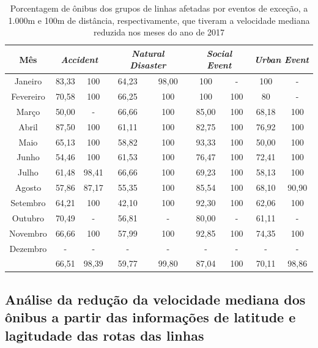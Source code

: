 \documentclass[
	12pt,				%
	oneside,			%
	a4paper,			%
	english,			%
	brazil				%
	]{abntex2ppgsi}
\begin{document}
{{\begin{table}[!htb]
\centering
\caption {Porcentagem de ônibus dos grupos de linhas afetadas por eventos de exceção, a 1.000m e 100m de distância, respectivamente, que tiveram a velocidade mediana reduzida nos meses do ano de 2017}
\label{tab:exceptEventVelocityImpAllStop}
\begin{tabular}{c|cc|cc|cc|cc}
\toprule
\textbf{Mês} & \multicolumn{2}{c}{\textit{\textbf{Accident}}} & \multicolumn{2}{c}{\textit{\textbf{Natural Disaster}}} & \multicolumn{2}{c}{\textit{\textbf{Social Event}}} &
\multicolumn{2}{c}{\textit{\textbf{Urban Event}}}\\
\midrule
Janeiro & 83,33 &  100 & 
64,23 &  98,00 & 
100 & - &
 100 & - \\
\hline
Fevereiro & 70,58 &  100 &
 66,25 &  100 &
 100 & 100 &
 80 & - \\
\hline
Março &  50,00 &  - & 
66,66 &  100 &
85,00 & 100 &
68,18 & 100 \\
\hline
Abril & 87,50 &100 & 
 61,11 & 100 & 
 82,75 & 100 & 
 76,92 &  100 \\
\hline
Maio & 65,13 &  100 &
 58,82 &  100 &
 93,33 & 100 &
 50,00 & 100 \\
\hline
Junho & 54,46 &  100 &
 61,53 &  100 &
 76,47 & 100 &
 72,41 & 100 \\
\hline
Julho & 61,48 &  98,41 &
 66,66 & 100 &
 69,23 & 100 &
58,13 & 100 \\
\hline
Agosto & 57,86 & 87,17 &
 55,35 & 100 &
 85,54 & 100 & 
 68,10 & 90,90 \\
\hline
Setembro & 64,21 & 100 &
 42,10 & 100 &
 92,30 & 100 & 
 62,06 & 100 \\
\hline
Outubro & 70,49 & - &
 56,81 & - &
 80,00 & - &
 61,11 & - \\
\hline
Novembro & 66,66 & 100 &
 57,99 & 100 &
 92,85 & 100 &
 74,35 & 100 \\
\hline
Dezembro & - & - & - & - & - & - & - & -  \\
\midrule
{} & 66,51 & 98,39 & 59,77 & 99,80 & 87,04 & 100 & 70,11 & 98,86  \\
\bottomrule
\end{tabular}
\end{table}

\subsection*{Análise da redução da velocidade mediana dos ônibus a partir das informações de latitude e lagitudade das rotas das linhas}

}}
\end{document}
